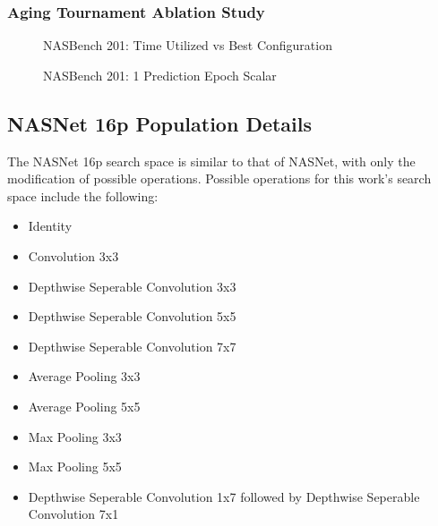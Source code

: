 \documentclass[twocolumn]{article}
\begin{document}
\FloatBarrier
\subsubsection{Aging Tournament Ablation Study}

\begin{figure}[!h]
    \begin{center}
        \resizebox{0.9\columnwidth}{!}{
            
        }
        \caption{NASBench 201: Time Utilized vs Best Configuration}
        \label{fig:evo_ext_nasbench_best_at_slice}
    \end{center}
\end{figure}

\begin{figure}[!h]
    \begin{center}
        \resizebox{0.9\columnwidth}{!}{
            
        }
        \caption{NASBench 201: 1 Prediction Epoch Scalar}
        \label{fig:evo_ext_nasbench_1x_acceleration}
    \end{center}
\end{figure}
\onecolumn

\subsection{NASNet 16p Population Details}

The NASNet 16p search space is similar to that of NASNet\cite{nasnet}, with only the modification of possible operations. 
Possible operations for this work's search space include the following:
\begin{multicols}{2}
\begin{itemize}
    \item Identity
    \item Convolution 3x3
    \item Depthwise Seperable Convolution 3x3
    \item Depthwise Seperable Convolution 5x5
    \item Depthwise Seperable Convolution 7x7
    \item Average Pooling 3x3
    \item Average Pooling 5x5
    \item Max Pooling 3x3
    \item Max Pooling 5x5
    \item Depthwise Seperable Convolution 1x7 followed by Depthwise Seperable Convolution 7x1
\end{itemize}
\end{multicols}
\end{document}
